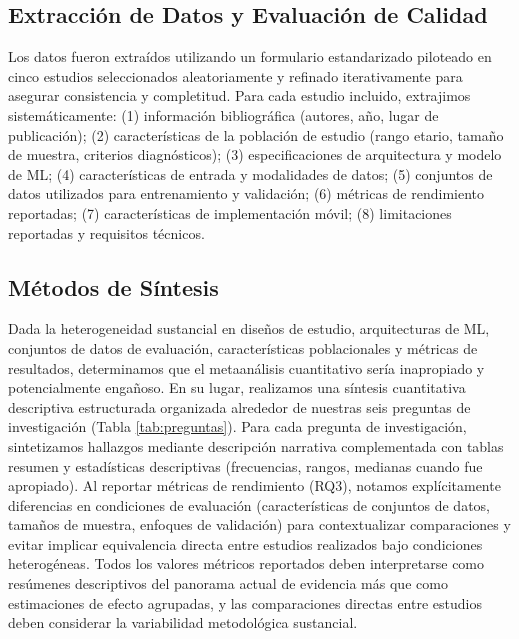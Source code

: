 \documentclass{ieeeaccess}
\begin{document}
	\subsection{Extracción de Datos y Evaluación de Calidad}
	Los datos fueron extraídos utilizando un formulario estandarizado piloteado en cinco estudios seleccionados aleatoriamente y refinado iterativamente para asegurar consistencia y completitud. Para cada estudio incluido, extrajimos sistemáticamente: (1) información bibliográfica (autores, año, lugar de publicación); (2) características de la población de estudio (rango etario, tamaño de muestra, criterios diagnósticos); (3) especificaciones de arquitectura y modelo de ML; (4) características de entrada y modalidades de datos; (5) conjuntos de datos utilizados para entrenamiento y validación; (6) métricas de rendimiento reportadas; (7) características de implementación móvil; (8) limitaciones reportadas y requisitos técnicos.
	
	\subsection{Métodos de Síntesis}
	Dada la heterogeneidad sustancial en diseños de estudio, arquitecturas de ML, conjuntos de datos de evaluación, características poblacionales y métricas de resultados, determinamos que el metaanálisis cuantitativo sería inapropiado y potencialmente engañoso. En su lugar, realizamos una síntesis cuantitativa descriptiva estructurada organizada alrededor de nuestras seis preguntas de investigación (Tabla \ref{tab:preguntas}). Para cada pregunta de investigación, sintetizamos hallazgos mediante descripción narrativa complementada con tablas resumen y estadísticas descriptivas (frecuencias, rangos, medianas cuando fue apropiado). Al reportar métricas de rendimiento (RQ3), notamos explícitamente diferencias en condiciones de evaluación (características de conjuntos de datos, tamaños de muestra, enfoques de validación) para contextualizar comparaciones y evitar implicar equivalencia directa entre estudios realizados bajo condiciones heterogéneas. Todos los valores métricos reportados deben interpretarse como resúmenes descriptivos del panorama actual de evidencia más que como estimaciones de efecto agrupadas, y las comparaciones directas entre estudios deben considerar la variabilidad metodológica sustancial.
	
\end{document}

